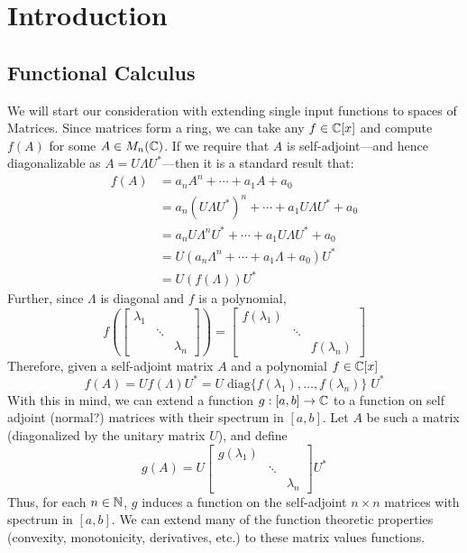 \chapter{Introduction}\label{ch:introduction}

\section{Functional Calculus}%
\label{sec:functionalcalc}

We will start our consideration with extending single input functions to spaces
of Matrices. Since matrices form a ring, we can take any $f \in \mathbb{C} [x]$ and
compute $f(A)$ for some $A \in M_n(\mathbb{C})$. If we require that $A$ is
self-adjoint---and hence diagonalizable as $A = U \Lambda U^*$---then it is a standard result that:
\begin{align*}
  f(A) &= a_nA^n + \cdots + a_1A + a_0 \\
  &= a_n \left( U\Lambda U^* \right) ^n + \cdots + a_1 U\Lambda U^* + a_0 \\
  &= a_n U\Lambda^n U^* + \cdots + a_1 U\Lambda U^* + a_0 \\
  &= U \left( a_n\Lambda ^n + \cdots + a_1\Lambda + a_0 \right) U^* \\
  &= U \left( f(\Lambda) \right) U^*
\end{align*}
Further, since \(\Lambda\) is diagonal and $f$ is a polynomial,
\[
  f \left( \begin{bmatrix} \lambda_1 &  &  \\  & \ddots &  \\  &  & \lambda_n \end{bmatrix}  \right)
  = \begin{bmatrix} f(\lambda_1) &  &  \\  & \ddots &  \\  &  & f(\lambda_n) \end{bmatrix}
\]
Therefore, given a self-adjoint matrix \(A\) and a polynomial \(f \in \mathbb{C} [x]\)
\[
  f(A) = Uf(\Lambda)U^* = U \;\text{diag}\{f(\lambda_{1}), \dots , f(\lambda_n)\} \; U^*
\]
With this in mind, we can extend a function \(g: [a,b] \to \mathbb{C} \) to a function
on self adjoint {\color{red} (normal?)} matrices with their spectrum in
\([a,b]\). Let \(A\) be such a matrix (diagonalized by the unitary matrix
\(U\)), and define
\[
  g(A) = U
  \begin{bmatrix} g(\lambda_1) & &\\ &\ddots& \\ & & \lambda_n \end{bmatrix}
  U^*
\]
Thus, for each \(n \in \mathbb{N} \), \(g\) induces a function on the self-adjoint
\(n \times n\) matrices with spectrum in \([a,b]\). We can extend many of the
function theoretic properties (\eg convexity, monotonicity, derivatives, etc.)
to these matrix values functions.


